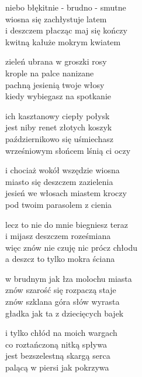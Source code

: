 \begin{text}
    niebo błękitnie - brudno - smutne\\
    wiosna się zachłystuje latem\\
    i deszczem płacząc maj się kończy\\
    kwitną kałuże mokrym kwiatem

    zieleń ubrana w groszki rosy\\
    krople na palce nanizane\\
    pachną jesienią twoje włosy\\
    kiedy wybiegasz na spotkanie

    ich kasztanowy ciepły połysk\\
    jest niby renet złotych koszyk\\
    październikowo się uśmiechasz\\
    wrześniowym słońcem lśnią ci oczy

    i chociaż wokół wszędzie wiosna\\
    miasto się deszczem zazielenia\\
    jesień we włosach miastem kroczy\\
    pod twoim parasolem z cienia

    lecz to nie do mnie biegniesz teraz\\
    i mijasz deszczem roześmiana\\
    więc znów nie czuję nic prócz chłodu\\
    a deszcz to tylko mokra ściana

    w brudnym jak łza molochu miasta\\
    znów szarość się rozpaczą staje\\
    znów szklana góra słów wyrasta\\
    gładka jak ta z dziecięcych bajek

    i tylko chłód na moich wargach\\
    co roztańczoną nitką spływa\\
    jest bezszelestną skargą serca\\
    palącą w piersi jak pokrzywa
\end{text}
\begin{chord}

\end{chord}